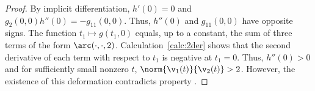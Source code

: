 \begin{proof}
By implicit differentiation, $h'(0) = 0$ and $g_2(0,0) h''(0) =
-g_{11}(0,0)$.  Thus, $h''(0)$ and $g_{11}(0,0)$ have opposite signs.
The function $t_1\mapsto g(t_1,0)$ equals, up to a constant, the sum
of three terms of the form $\arc(\cdot,\cdot,2)$.
Calculation~\ref{calc:2der} shows that the second derivative of each
term with respect to $t_1$ is negative at $t_1=0$.  Thus, $h''(0)>0$
and for sufficiently small nonzero $t$, $\norm{\v_1(t)}{\v_2(t)}>2$.
However, the existence of this deformation contradicts property
.
\end{proof}







%



